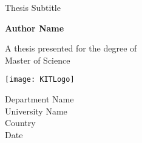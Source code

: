 
\begin{titlepage}
    \begin{center}
        \vspace*{1cm}
 
        \Huge
        \textbf{\mytitle}
 
        \vspace{0.5cm}
        \LARGE
        Thesis Subtitle
 
        \vspace{1.5cm}
 
        \textbf{Author Name}
 
        \vfill
 
        A thesis presented for the degree of\\
        Master of Science
 
        \vspace{0.8cm}
 
        \texttt{[image: KITLogo]}
 
        \Large
        Department Name\\
        University Name\\
        Country\\
        Date
 
    \end{center}
\end{titlepage}